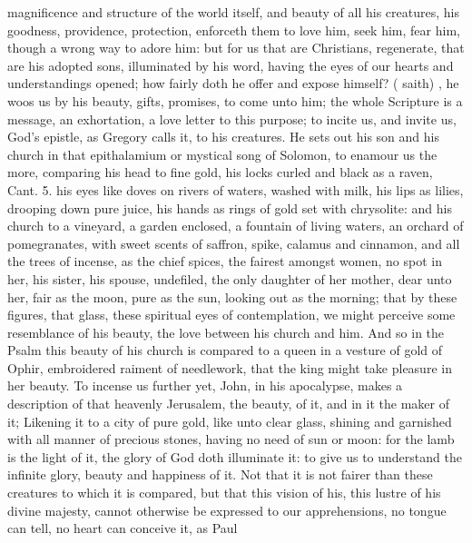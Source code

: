 {magnificence and structure of the world itself, and beauty of all his
creatures, his goodness, providence, protection, enforceth them to love
him, seek him, fear him, though a wrong way to adore him: but for us
that are Christians, regenerate, that are his adopted sons, illuminated
by his word, having the eyes of our hearts and understandings opened;
how fairly doth he offer and expose himself?  (\Austin{}
saith) , he woos us by his beauty, gifts, promises,
to come unto him; the whole Scripture is a message, an
exhortation, a love letter to this purpose; to incite us, and invite
us, God's epistle, as Gregory calls it, to his creatures. He sets
out his son and his church in that epithalamium or mystical song of
Solomon, to enamour us the more, comparing his head to fine gold, his
locks curled and black as a raven, Cant.  5. his eyes like doves on
rivers of waters, washed with milk, his lips as lilies, drooping down
pure juice, his hands as rings of gold set with chrysolite: and his
church to a vineyard, a garden enclosed, a fountain of living waters,
an orchard of pomegranates, with sweet scents of saffron, spike,
calamus and cinnamon, and all the trees of incense, as the chief
spices, the fairest amongst women, no spot in her, his sister,
his spouse, undefiled, the only daughter of her mother, dear unto her,
fair as the moon, pure as the sun, looking out as the morning; that by
these figures, that glass, these spiritual eyes of contemplation, we
might perceive some resemblance of his beauty, the love between his
church and him. And so in the  Psalm this beauty of his church is
compared to a queen in a vesture of gold of Ophir, embroidered raiment
of needlework, that the king might take pleasure in her beauty. To
incense us further yet, John, in his apocalypse, makes a
description of that heavenly Jerusalem, the beauty, of it, and in it
the maker of it; Likening it to a city of pure gold, like unto clear
glass, shining and garnished with all manner of precious stones, having
no need of sun or moon: for the lamb is the light of it, the glory of
God doth illuminate it: to give us to understand the infinite glory,
beauty and happiness of it. Not that it is not fairer than these
creatures to which it is compared, but that this vision of his, this
lustre of his divine majesty, cannot otherwise be expressed to our
apprehensions, no tongue can tell, no heart can conceive it, as Paul
}
